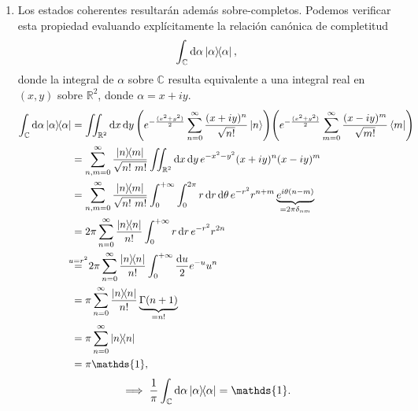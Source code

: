 \documentclass{scrartcl}
\newcommand{\inv}[1]{\frac{1}{#1}}
\newcommand{\realSet}{\mathbb{R}}
\newcommand{\complexSet}{\mathbb{C}}
\DeclareRobustCommand{\[}{\begin{equation}}
\DeclareRobustCommand{\]}{\end{equation}}
\begin{document}
\begin{enumerate}
\begin{enumerate}
        
        \item Los estados coherentes resultarán además sobre-completos. Podemos verificar esta propiedad evaluando explícitamente la relación canónica de completitud
        \[ \int_\complexSet \dd{\alpha} \dyad{\alpha}{\alpha}, \]
        donde la integral de $\alpha$ sobre $\complexSet$ resulta equivalente a una integral real en $(x, y)$ sobre $\realSet^2$, donde $\alpha = x + i y$.
        \begin{align}
            \int_\complexSet \dd{\alpha} \dyad{\alpha}{\alpha} &= \iint_{\realSet^2} \dd{x} \dd{y} \qty(e^{-\frac{(x^2 + y^2)}{2}} \sum_{n = 0}^\infty \frac{(x + i y)^n}{\sqrt{n!}} \ket{n} ) \qty(e^{-\frac{(x^2 + y^2)}{2}} \sum_{m = 0}^\infty \frac{(x - i y)^m}{\sqrt{m!}} \bra{m} ) \\
                &= \sum_{n, m = 0}^\infty \frac{\dyad{n}{m}}{\sqrt{n! \ m!}} \iint_{\realSet^2} \dd{x} \dd{y} e^{-x^2 - y^2} (x + i y)^n (x - i y)^m \\
                &= \sum_{n, m = 0}^\infty \frac{\dyad{n}{m}}{\sqrt{n! \ m!}} \int_0^{+\infty} \int_0^{2\pi} r \dd{r} \dd{\theta} e^{-r^2} r^{n + m} \underbrace{e^{i\theta (n - m)}}_{= 2\pi \delta_{nm}} \\
                &= 2\pi \sum_{n = 0}^\infty \frac{\dyad{n}{n}}{n!} \int_0^{+\infty} r \dd{r} e^{-r^2} r^{2n} \\
                &\stackrel{\mathclap{u = r^2}}{=} \ 2\pi \sum_{n = 0}^\infty \frac{\dyad{n}{n}}{n!} \int_0^{+\infty} \frac{\dd{u}}{2} e^{-u} u^{n} \\
                &= \pi \sum_{n = 0}^\infty \frac{\dyad{n}{n}}{n!} \underbrace{\Gamma(n + 1)}_{=n!} \\
                &= \pi \sum_{n = 0}^\infty \dyad{n}{n} \\
                &= \pi \mathds{1},
        \end{align}
        \[ \implies \inv{\pi} \int_\complexSet \dd{\alpha} \dyad{\alpha}{\alpha} = \mathds{1}. \]
        

\end{enumerate}
\end{enumerate}
\end{document}
